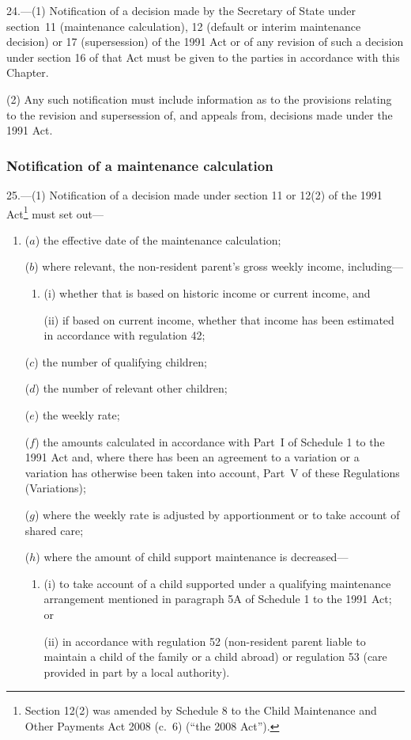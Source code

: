 \documentclass[12pt,a4paper]{article}
\begin{document}
24.---(1)  Notification of a decision made by the Secretary of State under section~11 (maintenance calculation), 12 (default or interim maintenance decision) or 17 (supersession) of the 1991 Act or of any revision of such a decision under section 16 of that Act must be given to the parties in accordance with this Chapter.

(2) Any such notification must include information as to the provisions relating to the revision and supersession of, and appeals from, decisions made under the 1991 Act.

\subsubsection[25. Notification of a maintenance calculation]{Notification of a maintenance calculation}

25.---(1)  Notification of a decision made under section 11 or 12(2) of the 1991 Act\footnote{Section 12(2) was amended by Schedule 8 to the Child Maintenance and Other Payments Act 2008 (c.~6) (“the 2008 Act”).} must set out—
\begin{enumerate}\item[]
($a$) the effective date of the maintenance calculation;

($b$) where relevant, the non-resident parent’s gross weekly income, including—
\begin{enumerate}\item[]
(i) whether that is based on historic income or current income, and

(ii) if based on current income, whether that income has been estimated in accordance with regulation 42;
\end{enumerate}

($c$) the number of qualifying children;

($d$) the number of relevant other children;

($e$) the weekly rate;

($f$) the amounts calculated in accordance with Part~I of Schedule 1 to the 1991 Act and, where there has been an agreement to a variation or a variation has otherwise been taken into account, Part~V of these Regulations (Variations);

($g$) where the weekly rate is adjusted by apportionment or to take account of shared care;

($h$) where the amount of child support maintenance is decreased—
\begin{enumerate}\item[]
(i) to take account of a child supported under a qualifying maintenance arrangement mentioned in paragraph 5A of Schedule 1 to the 1991 Act; or

(ii) in accordance with regulation 52 (non-resident parent liable to maintain a child of the family or a child abroad) or regulation 53 (care provided in part by a local authority).
\end{enumerate}
\end{enumerate}
\end{document}
